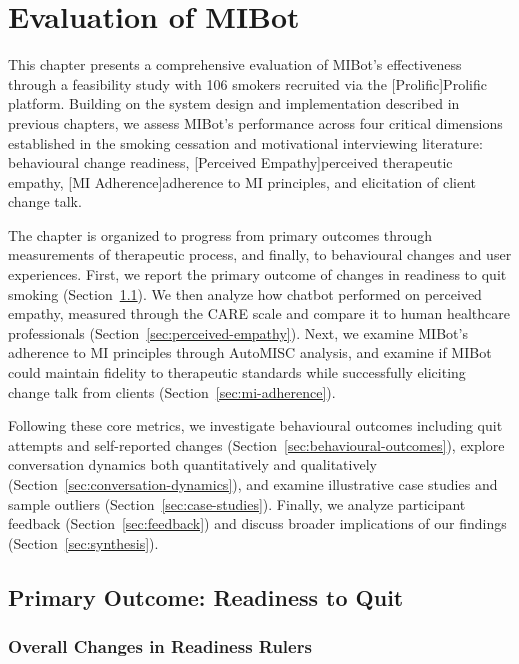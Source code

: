 \chapter{Evaluation of MIBot}
\label{ch:mibot-eval}

This chapter presents a comprehensive evaluation of MIBot's effectiveness through a feasibility study with 106 smokers recruited via the [Prolific]Prolific platform. Building on the system design and implementation described in previous chapters, we assess MIBot's performance across four critical dimensions established in the smoking cessation and motivational interviewing literature: behavioural change readiness, [Perceived Empathy]perceived therapeutic empathy, [MI Adherence]adherence to MI principles, and elicitation of client change talk.

The chapter is organized to progress from primary outcomes through measurements of therapeutic process, and finally, to behavioural changes and user experiences. First, we report the primary outcome of changes in readiness to quit smoking (Section~\ref{sec:primary-outcome}). We then analyze how chatbot performed on perceived empathy, measured through the CARE scale and compare it to human healthcare professionals (Section~\ref{sec:perceived-empathy}). Next, we examine MIBot's adherence to MI principles through AutoMISC analysis, and examine if MIBot could maintain fidelity to therapeutic standards while successfully eliciting change talk from clients (Section~\ref{sec:mi-adherence}).

Following these core metrics, we investigate behavioural outcomes including quit attempts and self-reported changes (Section~\ref{sec:behavioural-outcomes}), explore conversation dynamics both quantitatively and qualitatively (Section~\ref{sec:conversation-dynamics}), and examine illustrative case studies and sample outliers (Section~\ref{sec:case-studies}). Finally, we analyze participant feedback (Section~\ref{sec:feedback}) and discuss broader implications of our findings (Section~\ref{sec:synthesis}).

\section{Primary Outcome: Readiness to Quit}
\label{sec:primary-outcome}

\subsection{Overall Changes in Readiness Rulers}

